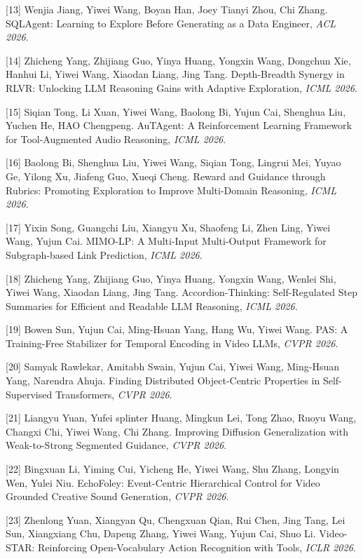 [13] Wenjia Jiang, Yiwei Wang, Boyan Han, Joey Tianyi Zhou, Chi Zhang. SQLAgent: Learning to Explore Before Generating as a Data Engineer, \textit{ACL 2026}.

[14] Zhicheng Yang, Zhijiang Guo, Yinya Huang, Yongxin Wang, Dongchun Xie, Hanhui Li, Yiwei Wang, Xiaodan Liang, Jing Tang. Depth-Breadth Synergy in RLVR: Unlocking LLM Reasoning Gains with Adaptive Exploration, \textit{ICML 2026}.

[15] Siqian Tong, Li Xuan, Yiwei Wang, Baolong Bi, Yujun Cai, Shenghua Liu, Yuchen He, HAO Chengpeng. AuTAgent: A Reinforcement Learning Framework for Tool-Augmented Audio Reasoning, \textit{ICML 2026}.

[16] Baolong Bi, Shenghua Liu, Yiwei Wang, Siqian Tong, Lingrui Mei, Yuyao Ge, Yilong Xu, Jiafeng Guo, Xueqi Cheng. Reward and Guidance through Rubrics: Promoting Exploration to Improve Multi-Domain Reasoning, \textit{ICML 2026}.

[17] Yixin Song, Guangchi Liu, Xiangyu Xu, Shaofeng Li, Zhen Ling, Yiwei Wang, Yujun Cai. MIMO-LP: A Multi-Input Multi-Output Framework for Subgraph-based Link Prediction, \textit{ICML 2026}.

[18] Zhicheng Yang, Zhijiang Guo, Yinya Huang, Yongxin Wang, Wenlei Shi, Yiwei Wang, Xiaodan Liang, Jing Tang. Accordion-Thinking: Self-Regulated Step Summaries for Efficient and Readable LLM Reasoning, \textit{ICML 2026}.

[19] Bowen Sun, Yujun Cai, Ming-Hsuan Yang, Hang Wu, Yiwei Wang. PAS: A Training-Free Stabilizer for Temporal Encoding in Video LLMs, \textit{CVPR 2026}.

[20] Samyak Rawlekar, Amitabh Swain, Yujun Cai, Yiwei Wang, Ming-Hsuan Yang, Narendra Ahuja. Finding Distributed Object-Centric Properties in Self-Supervised Transformers, \textit{CVPR 2026}.

[21] Liangyu Yuan, Yufei splinter Huang, Mingkun Lei, Tong Zhao, Ruoyu Wang, Changxi Chi, Yiwei Wang, Chi Zhang. Improving Diffusion Generalization with Weak-to-Strong Segmented Guidance, \textit{CVPR 2026}.

[22] Bingxuan Li, Yiming Cui, Yicheng He, Yiwei Wang, Shu Zhang, Longyin Wen, Yulei Niu. EchoFoley: Event-Centric Hierarchical Control for Video Grounded Creative Sound Generation, \textit{CVPR 2026}.

[23] Zhenlong Yuan, Xiangyan Qu, Chengxuan Qian, Rui Chen, Jing Tang, Lei Sun, Xiangxiang Chu, Dapeng Zhang, Yiwei Wang, Yujun Cai, Shuo Li. Video-STAR: Reinforcing Open-Vocabulary Action Recognition with Tools, \textit{ICLR 2026}.

